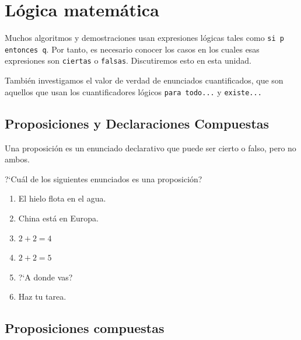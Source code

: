\section{Lógica matemática}


    Muchos algoritmos y demostraciones usan expresiones lógicas tales como
    \texttt{si p entonces q}. Por tanto, es necesario conocer los casos en los cuales esas expresiones son \texttt{ciertas} o \texttt{falsas}. Discutiremos esto en esta unidad. 

    También investigamos el valor de verdad de enunciados cuantificados, que son aquellos que usan los cuantificadores lógicos \texttt{para todo...} y \texttt{existe...}


\subsection{Proposiciones y Declaraciones Compuestas}

    Una proposición es un enunciado declarativo que puede ser cierto o falso, pero no ambos. 

    \begin{problema}
        ?`Cuál de los siguientes enunciados es una proposición?
        \begin{multicols}{2}
            \begin{enumerate}
                \item El hielo flota en el agua.
                \item China está en Europa.
                \item $2+2=4$
                \item $2+2=5$
                \item ?`A donde vas?
                \item Haz tu tarea.
            \end{enumerate}
        \end{multicols}
    \end{problema}
    


\subsection{Proposiciones compuestas}


